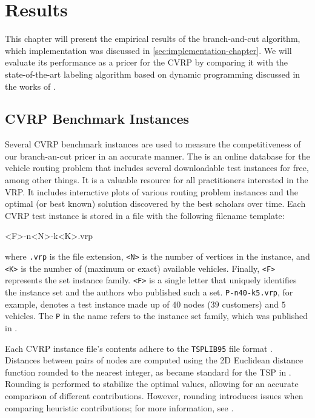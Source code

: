 \chapter{Results}
\label{sec:results}

This chapter will present the empirical results of the branch-and-cut algorithm, which implementation was discussed in \cref{sec:implementation-chapter}.
We will evaluate its performance as a pricer for the CVRP by comparing it with the state-of-the-art labeling algorithm based on dynamic programming discussed in the works of \textcite{pessoa2020generic, sadykov2021bucket}.

\medskip

\section{CVRP Benchmark Instances}
\label{sec:results-benchmark-instances}

Several CVRP benchmark instances are used to measure the competitiveness
of our branch-an-cut pricer in an accurate manner.
The 
is an online database for the vehicle routing problem that includes
several downloadable test instances for free, among other things.
It is a valuable resource for all practitioners interested in the VRP.
It includes interactive plots of various routing problem instances
and the optimal (or best known) solution discovered by the best scholars over time.
Each CVRP test instance is stored in a file with the following filename template:
\begin{center}
	\begin{LVerbatim}
		<F>-n<N>-k<K>.vrp
	\end{LVerbatim}
\end{center}
where \texttt{.vrp} is the file extension,
\texttt{<N>} is the number of vertices in the instance, and
\texttt{<K>} is the number of (maximum or exact) available vehicles.
Finally, \texttt{<F>} represents the set instance family.
\texttt{<F>} is a single letter that uniquely identifies the instance
set and the authors who published such a set.
\texttt{P-n40-k5.vrp}, for example, denotes a test instance made up
of $40$ nodes ($39$ customers) and $5$ vehicles.
The \texttt{P} in the name refers to the instance set family,
which was published in \textcite{augerat1995}.

Each CVRP instance file's contents adhere
to the \texttt{TSPLIB95} file format \parencite{reinelt1995}.
Distances between pairs of nodes are computed
using the 2D Euclidean distance function rounded to the nearest integer,
as became standard for the TSP in \textcite{reinelt1991}.
Rounding is performed to stabilize the optimal values,
allowing for an accurate comparison of different contributions.
However, rounding introduces issues when comparing heuristic contributions;
for more information, see \textcite{uchoa2017}.

